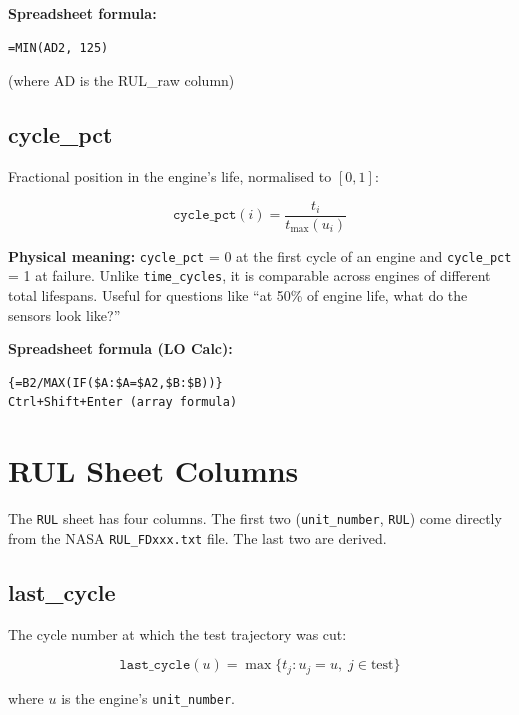\documentclass[11pt, a4paper]{article}
\begin{document}
\textbf{Spreadsheet formula:}
\begin{verbatim}
=MIN(AD2, 125)
\end{verbatim}
(where AD is the RUL\_raw column)

\subsection{cycle\_pct}

Fractional position in the engine's life, normalised to $[0, 1]$:

\begin{equation}
  \texttt{cycle\_pct}(i) = \frac{t_i}{t_{\max}(u_i)}
  \label{eq:cyclepct}
\end{equation}

\textbf{Physical meaning:}
\texttt{cycle\_pct} = 0 at the first cycle of an engine and
\texttt{cycle\_pct} = 1 at failure. Unlike \texttt{time\_cycles},
it is comparable across engines of different total lifespans.
Useful for questions like ``at 50\% of engine life, what do
the sensors look like?''

\textbf{Spreadsheet formula (LO Calc):}
\begin{verbatim}
{=B2/MAX(IF($A:$A=$A2,$B:$B))}
Ctrl+Shift+Enter (array formula)
\end{verbatim}

\section{RUL Sheet Columns}

The \texttt{RUL} sheet has four columns. The first two
(\texttt{unit\_number}, \texttt{RUL}) come directly from the
NASA \texttt{RUL\_FDxxx.txt} file. The last two are derived.

\subsection{last\_cycle}

The cycle number at which the test trajectory was cut:

\begin{equation}
  \texttt{last\_cycle}(u) = \max\{t_j : u_j = u,\; j \in \text{test}\}
  \label{eq:lastcycle}
\end{equation}

where $u$ is the engine's \texttt{unit\_number}.
\end{document}
